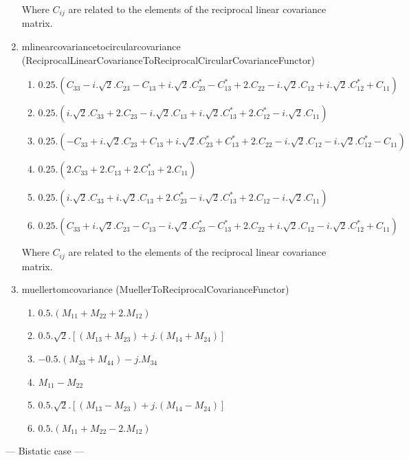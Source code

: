 \begin{enumerate}
Where $C_{ij}$ are related to the elements of the reciprocal linear covariance
matrix.
 
\item mlinearcovariancetocircularcovariance (ReciprocalLinearCovarianceToReciprocalCircularCovarianceFunctor)
\begin{enumerate}
\item $ 0.25 . ( C_{33}-i.\sqrt{2}.C_{23}-C_{13}+i.\sqrt{2}.C_{23}^{*}-C_{13}^{*}+2.C_{22}-i.\sqrt{2}.C_{12}+i.\sqrt{2}.C_{12}^{*}+C_{11} ) $ 
\item $ 0.25 . ( i.\sqrt{2}.C_{33}+2.C_{23}-i.\sqrt{2}.C_{13}+i.\sqrt{2}.C_{13}^{*}+2.C_{12}^{*}-i.\sqrt{2}.C_{11} ) $ 
\item $ 0.25 . ( -C_{33}+i.\sqrt{2}.C_{23}+C_{13}+i.\sqrt{2}.C_{23}^{*}+C_{13}^{*}+2.C_{22}-i.\sqrt{2}.C_{12}-i.\sqrt{2}.C_{12}^{*}-C_{11} ) $ 
\item $ 0.25 . ( 2.C_{33}+2.C_{13}+2.C_{13}^{*}+2.C_{11} ) $ 
\item $ 0.25 . ( i.\sqrt{2}.C_{33}+i.\sqrt{2}.C_{13}+2.C_{23}^{*}-i.\sqrt{2}.C_{13}^{*}+2.C_{12}-i.\sqrt{2}.C_{11} ) $ 
\item $ 0.25 . ( C_{33}+i.\sqrt{2}.C_{23}-C_{13}-i.\sqrt{2}.C_{23}^{*}-C_{13}^{*}+2.C_{22}+i.\sqrt{2}.C_{12}-i.\sqrt{2}.C_{12}^{*}+C_{11} ) $
\end{enumerate}

Where $C_{ij}$ are related to the elements of the reciprocal linear covariance
matrix.

\item muellertomcovariance (MuellerToReciprocalCovarianceFunctor)
\begin{enumerate}
\item $ 0.5.(M_{11}+M_{22}+2.M_{12}) $ 
\item $ 0.5.\sqrt{2}.[(M_{13}+M_{23}) + j.(M_{14}+M_{24})] $ 
\item $ -0.5.(M_{33}+M_{44}) - j.M_{34} $ 
\item $ M_{11}-M_{22} $ 
\item $ 0.5.\sqrt{2}.[(M_{13}-M_{23}) + j.(M_{14}-M_{24})] $ 
\item $ 0.5.(M_{11}+M_{22}-2.M_{12}) $
\end{enumerate}

\end{enumerate}

--- Bistatic case ---

